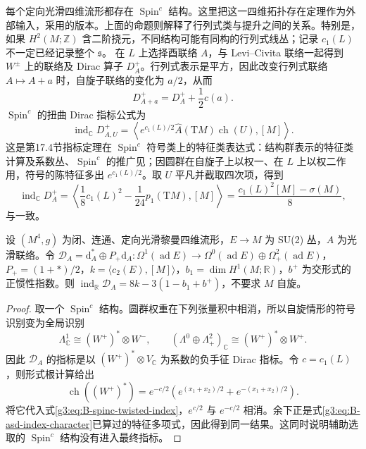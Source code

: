 每个定向光滑四维流形都存在 \(\operatorname{Spin}^c\) 结构。这里把这一四维拓扑存在定理作为外部输入，采用\cite[第1.3.3节，例1.3.16(c)]{Nicolaescu2000SeibergWitten}的版本。上面的命题则解释了行列式类与提升之间的关系。特别是，如果 \(H^2(M;\mathbb Z)\) 含二阶挠元，不同结构可能有同构的行列式线丛；记录 \(c_1(L)\) 不一定已经记录整个 \(\mathfrak s\)。
\ProseParagraphBreak
在 \(L\) 上选择酉联络 \(A\)，与 Levi--Civita 联络一起得到 \(W^\pm\) 上的联络及 Dirac 算子 \(D_A^+\)。行列式表示是平方，因此改变行列式联络 \(A\mapsto A+a\) 时，自旋子联络的变化为 \(a/2\)，从而
\begin{equation}\label{g3:eq:B-spinc-dirac-variation}
 D_{A+a}^+=D_A^++\frac12c(a).
\end{equation}
\(\operatorname{Spin}^c\) 的扭曲 Dirac 指标公式为
\begin{equation}\label{g3:eq:B-spinc-twisted-index}
 \operatorname{ind}_{\mathbb C}D_{A,U}^+
 =\left\langle e^{c_1(L)/2}\widehat A(\mathrm TM)
       \operatorname{ch}(U),[M]\right\rangle.
\end{equation}
这是第17.4节指标定理在 \(\operatorname{Spin}^c\) 符号类上的特征类表达式：结构群表示的特征类计算及系数丛、\(\operatorname{Spin}^c\) 的推广见\cite[第2节命题(2.17)，第559页；第5节定理(5.3)后注2、注4，第571页]{AtiyahSinger1968III}；因圆群在自旋子上以权一、在 \(L\) 上以权二作用，符号的陈特征多出 \(e^{c_1(L)/2}\)。取 \(U\) 平凡并截取四次项，得到
\begin{equation}\label{g3:eq:B-spinc-dirac-index}
 \operatorname{ind}_{\mathbb C}D_A^+
 =\left\langle\frac18c_1(L)^2-\frac1{24}p_1(\mathrm TM),[M]\right\rangle
 =\frac{c_1(L)^2[M]-\sigma(M)}8,
\end{equation}
与\cite[第1.3.4节，式(1.3.20)]{Nicolaescu2000SeibergWitten}一致。

\begin{proposition}\label{g3:prop:B-spinc-asd-index-completion}
 设 \((M^4,g)\) 为闭、连通、定向光滑黎曼四维流形，\(E\to M\) 为 SU(2) 丛，\(A\) 为光滑联络。令 \(\mathcal D_A=\mathrm d_A^*\oplus P_+\mathrm d_A:\Omega^1(\operatorname{ad}E)\to\Omega^0(\operatorname{ad}E)\oplus\Omega^2_+(\operatorname{ad}E)\)，\(P_+=(1+*)/2\)，\(k=\langle c_2(E),[M]\rangle\)，\(b_1=\dim H^1(M;\mathbb R)\)，\(b^+\) 为交形式的正惯性指数。则 \(\operatorname{ind}_{\mathbb R}\mathcal D_A=8k-3(1-b_1+b^+)\)，不要求 \(M\) 自旋。
\end{proposition}
\begin{proof}
 取一个 \(\operatorname{Spin}^c\) 结构。圆群权重在下列张量积中相消，所以自旋情形的符号识别变为全局识别
 \[
 \Lambda^1_{\mathbb C}\cong(W^+)^*\otimes W^- ,\qquad
 (\Lambda^0\oplus\Lambda^2_+)_{\mathbb C}
       \cong(W^+)^*\otimes W^+.
 \]
 因此 \(\mathcal D_A\) 的指标是以 \((W^+)^*\otimes V_{\mathbb C}\) 为系数的负手征 Dirac 指标。令 \(c=c_1(L)\)，则形式根计算给出
 \[
 \operatorname{ch}((W^+)^*)
 =e^{-c/2}\left(e^{(x_1+x_2)/2}+e^{-(x_1+x_2)/2}\right).
 \]
 将它代入式\eqref{g3:eq:B-spinc-twisted-index}，\(e^{c/2}\) 与 \(e^{-c/2}\) 相消。余下正是式\eqref{g3:eq:B-asd-index-character}已算过的特征多项式，因此得到同一结果。这同时说明辅助选取的 \(\operatorname{Spin}^c\) 结构没有进入最终指标。
\end{proof}

